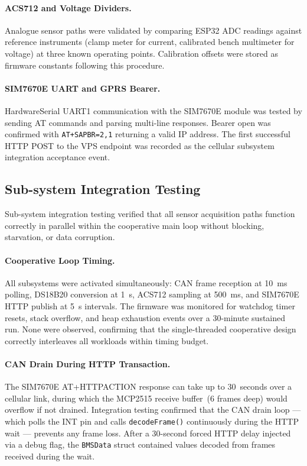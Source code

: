 \paragraph{ACS712 and Voltage Dividers.}
Analogue sensor paths were validated by comparing ESP32 ADC readings against reference instruments (clamp meter for current, calibrated bench multimeter for voltage) at three known operating points. Calibration offsets were stored as firmware constants following this procedure.

\paragraph{SIM7670E UART and GPRS Bearer.}
HardwareSerial UART1 communication with the SIM7670E module was tested by sending AT commands and parsing multi-line responses. Bearer open was confirmed with \texttt{AT+SAPBR=2,1} returning a valid IP address. The first successful HTTP POST to the VPS endpoint was recorded as the cellular subsystem integration acceptance event.

\subsection{Sub-system Integration Testing}

Sub-system integration testing verified that all sensor acquisition paths function correctly in parallel within the cooperative main loop without blocking, starvation, or data corruption.

\paragraph{Cooperative Loop Timing.}
All subsystems were activated simultaneously: CAN frame reception at 10~ms polling, DS18B20 conversion at 1~s, ACS712 sampling at 500~ms, and SIM7670E HTTP publish at 5~s intervals. The firmware was monitored for watchdog timer resets, stack overflow, and heap exhaustion events over a 30-minute sustained run. None were observed, confirming that the single-threaded cooperative design correctly interleaves all workloads within timing budget.

\paragraph{CAN Drain During HTTP Transaction.}
The SIM7670E AT+HTTPACTION response can take up to 30~seconds over a cellular link, during which the MCP2515 receive buffer~(6 frames deep) would overflow if not drained. Integration testing confirmed that the CAN drain loop --- which polls the INT pin and calls \texttt{decodeFrame()} continuously during the HTTP wait --- prevents any frame loss. After a 30-second forced HTTP delay injected via a debug flag, the \texttt{BMSData} struct contained values decoded from frames received during the wait.

